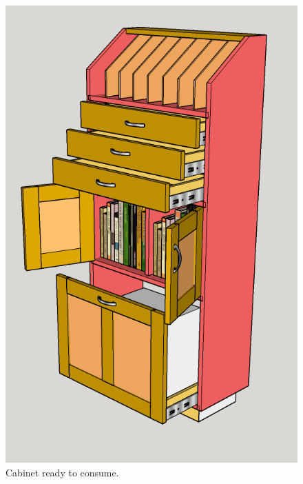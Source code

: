 \begin{figure}[!ht]
    \centering
    \includegraphics[height=0.75\textheight]{img/krs2}
    \caption{Cabinet ready to consume.\label{fig:intro2}}
\end{figure}